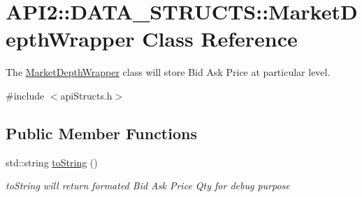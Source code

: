 \hypertarget{class_a_p_i2_1_1_d_a_t_a___s_t_r_u_c_t_s_1_1_market_depth_wrapper}{\section{A\-P\-I2\-:\-:D\-A\-T\-A\-\_\-\-S\-T\-R\-U\-C\-T\-S\-:\-:Market\-Depth\-Wrapper Class Reference}
\label{class_a_p_i2_1_1_d_a_t_a___s_t_r_u_c_t_s_1_1_market_depth_wrapper}
}


The \hyperlink{class_a_p_i2_1_1_d_a_t_a___s_t_r_u_c_t_s_1_1_market_depth_wrapper}{Market\-Depth\-Wrapper} class will store Bid Ask Price at particular level.  




{\ttfamily \#include $<$api\-Structs.\-h$>$}

\subsection*{Public Member Functions}
\begin{DoxyCompactItemize}
\item 
std\-::string \hyperlink{class_a_p_i2_1_1_d_a_t_a___s_t_r_u_c_t_s_1_1_market_depth_wrapper_a5fb322bdea13469db53983e36b2691fe}{to\-String} ()
\begin{DoxyCompactList}\small\item\em to\-String will return formated Bid Ask Price Qty for debug purpose \end{DoxyCompactList}\end{DoxyCompactItemize}

